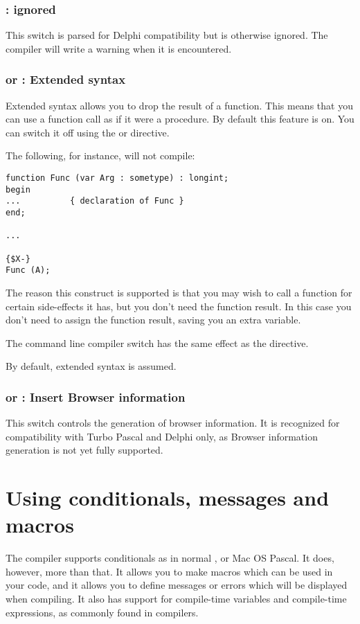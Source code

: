 \subsection{ : ignored}
This switch is parsed for Delphi compatibility but is otherwise ignored. 
The compiler will write a warning when it is encountered.

\subsection{ or  : Extended syntax}

Extended syntax allows you to drop the result of a function. This means that
you can use a function call as if it were a procedure. By default this feature
is on. You can switch it off using the  or
directive.

The following, for instance, will not compile:
\begin{verbatim}
function Func (var Arg : sometype) : longint;
begin
...          { declaration of Func }
end;

...

{$X-}
Func (A);
\end{verbatim}
The reason this construct is supported is that you may wish to call a
function for certain side-effects it has, but you don't need the function
result. In this case you don't need to assign the function result, saving
you an extra variable.

The command line compiler switch  has the same effect as the
 directive.

By default, extended syntax is assumed.


\subsection{ or  : Insert Browser information}

This switch controls the generation of browser information. It is recognized
for compatibility with Turbo Pascal and Delphi only, as Browser information
generation is not yet fully supported.


\chapter{Using conditionals, messages and macros}
\label{ch:CondMessageMacro}
The \fpc compiler supports conditionals as in normal \tp, \delphi or Mac OS
Pascal. It does, however, more than that. It allows you to make macros which can be used in
your code, and it allows you to define messages or errors which will be
displayed when compiling. It also has support for compile-time variables and
compile-time expressions, as commonly found in \macos compilers.

